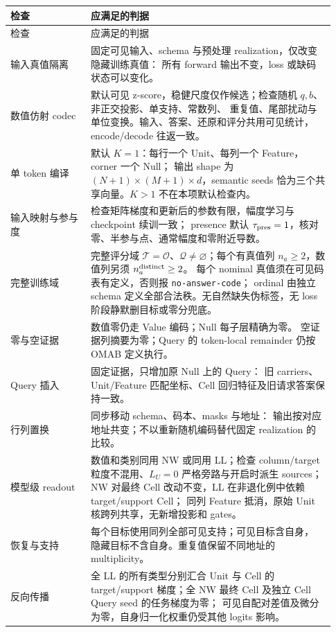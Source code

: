 \documentclass[11pt,UTF8,fontset=fandol]{ctexart}
\numberwithin{equation}{section}
\theoremstyle{definition}
\newcommand{\Oset}{\mathcal O}
\newcommand{\Qset}{\mathcal Q}
\newcommand{\TargetSet}{\mathcal T}
\begin{document}
\begin{longtable}{>{\raggedright\arraybackslash}p{0.23\linewidth}
                  >{\raggedright\arraybackslash}p{0.70\linewidth}}
\toprule
检查 & 应满足的判据\\
\midrule
\endfirsthead
\toprule 检查 & 应满足的判据\\\midrule
\endhead
输入真值隔离 & 固定可见输入、schema 与预处理 realization，仅改变隐藏训练真值：
所有 forward 输出不变，loss 或缺码状态可以变化。\\
数值仿射 codec & 默认可见 z-score，稳健尺度仅作候选；检查随机 $q,b$、非正交投影、单支持、常数列、
重复值、尾部扰动与单位变换。输入、答案、还原和评分共用可见统计，encode/decode 往返一致。\\
单 token 编译 & 默认 $K=1$：每行一个 Unit、每列一个 Feature，corner 一个 Null；
输出 shape 为 $(N+1)\times(M+1)\times d$，semantic seeds 恰为三个共享向量。$K>1$ 不在本项默认检查内。\\
输入映射与参与度 & 检查矩阵梯度和更新后的参数有限，幅度学习与 checkpoint 续训一致；
presence 默认 $\tau_{\rm pres}=1$，核对零、半参与点、通常幅度和零附近导数。\\
完整训练域 & 完整评分域 $\TargetSet=\Oset$、$\Qset\ne\varnothing$；每个有真值列 $n_a\ge2$，数值列另须 $n_a^{\rm distinct}\ge2$。
每个 nominal 真值须在可见码表有定义，否则报 \texttt{no-answer-code}；
ordinal 由独立 schema 定义全部合法秩。无自然缺失伪标签，无 loss 阶段静默删目标或零分兜底。\\
零与空证据 & 数值零仍走 Value 编码；Null 每子层精确为零。
空证据列摘要为零；Query 的 token-local remainder 仍按 OMAB 定义执行。\\
Query 插入 & 固定证据，只增加原 Null 上的 Query：
旧 carriers、Unit/Feature 匹配坐标、Cell 回归特征及旧请求答案保持一致。\\
行列置换 & 同步移动 schema、码本、masks 与地址：
输出按对应地址共变；不以重新随机编码替代固定 realization 的比较。\\
模型级 readout & 数值和类别同用 NW 或同用 LL；检查 column/target 粒度不混用、$L_U=0$ 严格旁路与开启时派生 sources；NW 对最终 Cell 改动不变，LL 在非退化例中依赖 target/support Cell；
同列 Feature 抵消，原始 Unit 核跨列共享，无新增投影和 gates。\\
恢复与支持 & 每个目标使用同列全部可见支持；可见目标含自身，
隐藏目标不含自身。重复值保留不同地址的 multiplicity。\\
反向传播 & 全 LL 的所有类型分别汇合 Unit 与 Cell 的 target/support 梯度；全 NW 最终 Cell 及独立 Cell Query seed 的任务梯度为零；
可见自配对差值及微分为零，自身归一化权重仍受其他 logits 影响。\\

\end{longtable}
\end{document}
